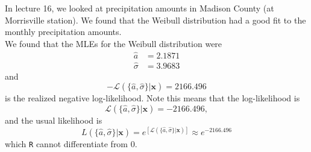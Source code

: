 \documentclass{article}\usepackage[]{graphicx}\usepackage[]{xcolor}
\begin{document}
In lecture 16, we looked at precipitation amounts in Madison County (at 
Morrisville station). We found that the Weibull distribution had a good fit
to the monthly precipitation amounts.\\

We found that the MLEs for the Weibull distribution were 
\begin{align*}
    \hat{a}&=2.1871\\
    \hat{\sigma}&=3.9683
\end{align*}
and
\[-\mathcal{L}(\{\hat{a}, \hat{\sigma}\}|\mathbf{x}) = 2166.496\]
is the realized negative log-likelihood.
Note this means that the log-likelihood is
\[\mathcal{L}(\{\hat{a}, \hat{\sigma}\}|\mathbf{x}) = -2166.496,\]
and the usual likelihood is
\[L(\{\hat{a}, \hat{\sigma}\}|\mathbf{x}) = e^{\left[\mathcal{L}(\{\hat{a}, \hat{\sigma}\}|\mathbf{x})\right]} \approx e^{-2166.496}\]
which \texttt{R} cannot differentiate from 0.
\end{document}
